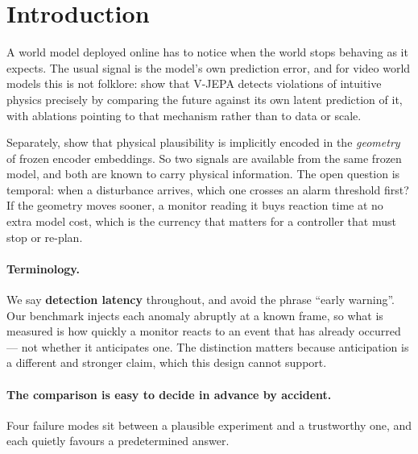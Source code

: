 \section{Introduction}

A world model deployed online has to notice when the world stops behaving as it
expects. The usual signal is the model's own prediction error, and for video
world models this is not folklore: \citet{garrido2025intuitive} show that V-JEPA
detects violations of intuitive physics precisely by comparing the future
against its own latent prediction of it, with ablations pointing to that
mechanism rather than to data or scale.

Separately, \citet{interno2026geophys} show that physical plausibility is
implicitly encoded in the \emph{geometry} of frozen encoder embeddings. So two
signals are available from the same frozen model, and both are known to carry
physical information. The open question is temporal: when a disturbance arrives,
which one crosses an alarm threshold first? If the geometry moves sooner, a
monitor reading it buys reaction time at no extra model cost, which is the
currency that matters for a controller that must stop or re-plan.

\paragraph{Terminology.}
We say \textbf{detection latency} throughout, and avoid the phrase ``early
warning''. Our
benchmark injects each anomaly abruptly at a known frame, so what is measured is
how quickly a monitor reacts to an event that has already occurred --- not
whether it anticipates one. The distinction matters because anticipation is a
different and stronger claim, which this design cannot support.

\paragraph{The comparison is easy to decide in advance by accident.}
Four failure modes sit between a plausible experiment and a trustworthy one, and
each quietly favours a predetermined answer.

